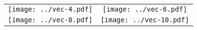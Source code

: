 \documentclass[12pt, a4paper]{report}
\begin{document}
\renewcommand\arraystretch{0}
\renewcommand\tabcolsep{0pt}


\begin{tabular}{cc}
\texttt{[image: ../vec-4.pdf]} &
\texttt{[image: ../vec-6.pdf]} \\
\texttt{[image: ../vec-8.pdf]} &
\texttt{[image: ../vec-10.pdf]} \\
\end{tabular}
\end{document}
